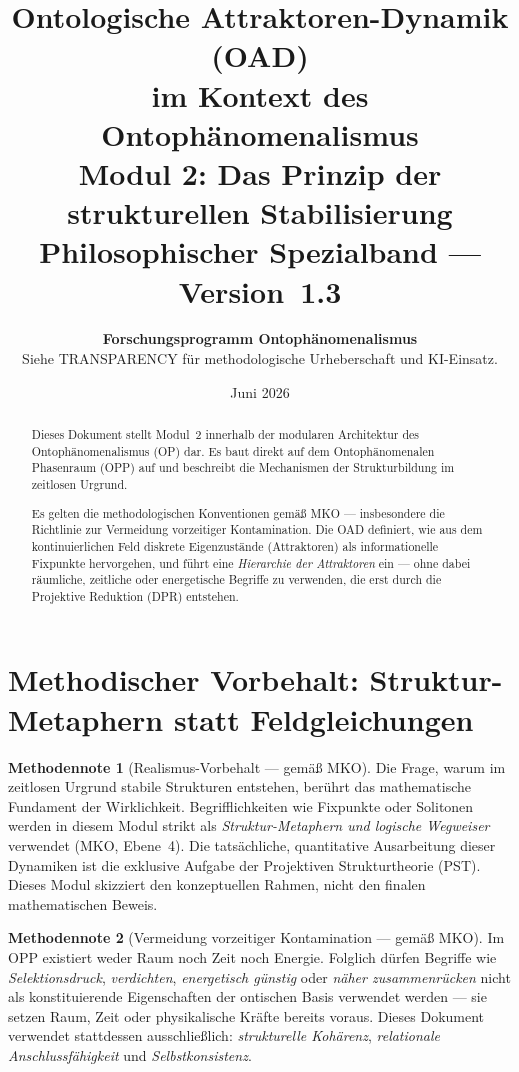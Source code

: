 \documentclass[11pt,a4paper]{article}
\title{
  \textbf{Ontologische Attraktoren-Dynamik (OAD)}\\
  \textbf{im Kontext des Ontoph\"{a}nomenalismus}\\[0.4em]
  {\large Modul 2: Das Prinzip der strukturellen Stabilisierung}\\[0.5em]
  {\normalsize Philosophischer Spezialband --- Version~1.3}
}
\author{
  \textbf{Forschungsprogramm Ontoph\"{a}nomenalismus}\\
  \small Siehe TRANSPARENCY f\"{u}r methodologische Urheberschaft und KI-Einsatz.
}
\date{Juni 2026}
\theoremstyle{plain}
\theoremstyle{definition}
\newtheorem{methodennote}{Methodennote}[section]
\begin{document}
\maketitle

\begin{abstract}
Dieses Dokument stellt Modul~2 innerhalb der modularen Architektur des
Ontoph\"{a}nomenalismus (OP) dar. Es baut direkt auf dem Ontoph\"{a}nomenalen Phasenraum
(OPP) auf und beschreibt die Mechanismen der Strukturbildung im zeitlosen Urgrund.

Es gelten die methodologischen Konventionen gem\"{a}\ss{} MKO --- insbesondere die
Richtlinie zur Vermeidung vorzeitiger Kontamination. Die OAD definiert, wie aus dem
kontinuierlichen Feld diskrete Eigenzust\"{a}nde (Attraktoren) als informationelle
Fixpunkte hervorgehen, und f\"{u}hrt eine \emph{Hierarchie der Attraktoren} ein --- ohne
dabei r\"{a}umliche, zeitliche oder energetische Begriffe zu verwenden, die erst durch
die Projektive Reduktion (DPR) entstehen.
\end{abstract}

\tableofcontents
\newpage

\section{Methodischer Vorbehalt: Struktur-Metaphern statt Feldgleichungen}

\begin{methodennote}[Realismus-Vorbehalt --- gem\"{a}\ss{} MKO]
Die Frage, warum im zeitlosen Urgrund stabile Strukturen entstehen, ber\"{u}hrt das
mathematische Fundament der Wirklichkeit. Begrifflichkeiten wie \glqq{}Fixpunkte\grqq{}
oder \glqq{}Solitonen\grqq{} werden in diesem Modul strikt als \emph{Struktur-Metaphern
und logische Wegweiser} verwendet (MKO, Ebene~4). Die tats\"{a}chliche, quantitative
Ausarbeitung dieser Dynamiken ist die exklusive Aufgabe der Projektiven Strukturtheorie
(PST). Dieses Modul skizziert den konzeptuellen Rahmen, nicht den finalen mathematischen
Beweis.
\end{methodennote}

\begin{methodennote}[Vermeidung vorzeitiger Kontamination --- gem\"{a}\ss{} MKO]
Im OPP existiert weder Raum noch Zeit noch Energie. Folglich d\"{u}rfen Begriffe wie
\emph{Selektionsdruck}, \emph{verdichten}, \emph{energetisch g\"{u}nstig} oder
\emph{n\"{a}her zusammenr\"{u}cken} nicht als konstituierende Eigenschaften der
ontischen Basis verwendet werden --- sie setzen Raum, Zeit oder physikalische Kr\"{a}fte
bereits voraus. Dieses Dokument verwendet stattdessen ausschlie\ss{}lich:
\emph{strukturelle Koh\"{a}renz}, \emph{relationale Anschlussf\"{a}higkeit} und
\emph{Selbstkonsistenz}.
\end{methodennote}
\end{document}
